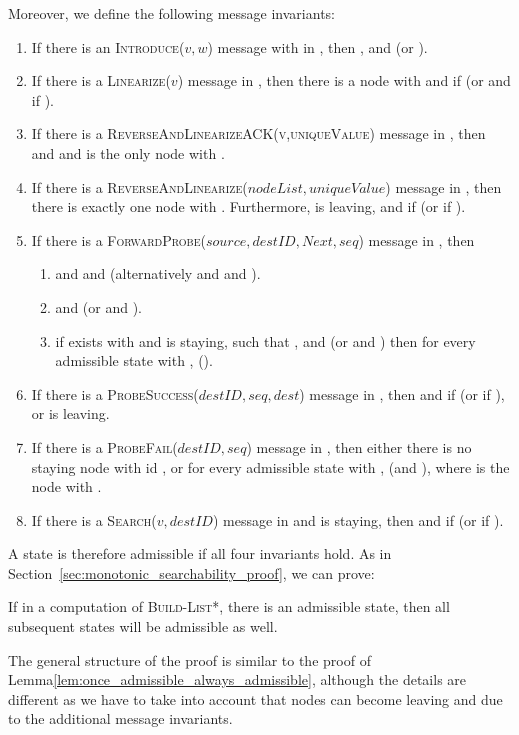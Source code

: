 \documentclass[a4paper,USenglish]{lipics}
\newcommand{\blpp}{\textsc{Build-List*}\xspace}
\newcommand{\linearize}[1]{\textsc{Linearize(\ensuremath{#1})}\xspace}
\newcommand{\introduce}[1]{\textsc{Introduce(\ensuremath{#1})}\xspace}
\newcommand{\search}[1]{\textsc{Search(\ensuremath{#1})}\xspace}
\newcommand{\forwardprobe}[1]{\textsc{ForwardProbe(\ensuremath{#1})}\xspace}
\newcommand{\psuccess}[1]{\textsc{ProbeSuccess(\ensuremath{#1})}\xspace}
\newcommand{\pfail}[1]{\textsc{ProbeFail(\ensuremath{#1})}\xspace}
\newcommand{\revandlin}[1]{\textsc{ReverseAndLinearize(\ensuremath{#1})}\xspace} \newcommand{\revandlinREQ}[1]{\textsc{ReverseAndLinearizeREQ(#1)}\xspace}
\newcommand{\revandlinACK}[1]{\textsc{ReverseAndLinearizeACK(#1)}\xspace}
\begin{document}
Moreover, we define the following message invariants:
\begin{enumerate}
    \item If there is an \introduce{v,w} message with  in , then , and  (or ).
    \item If there is a \linearize{v} message in , then there is a node  with  and  if  (or  and  if ).
    \item If there is a \revandlinACK{v,uniqueValue} message in , then  and  and  is the only node with .
    \item If there is a \revandlin{nodeList,uniqueValue} message in , then there is exactly one node  with .
    Furthermore,  is leaving, and  if  (or  if ).
    \item If there is a \forwardprobe{source,destID,Next,seq} message in , then
    \begin{enumerate}
	\item  and  and  
	(alternatively  and  and ).
	\item  and  (or  and ).
	\item if  exists with  and  is staying, such that , and  (or  and ) then for every admissible state with ,  ().
    \end{enumerate}
    \item If there is a \psuccess{destID, seq, dest} message in , then  and  if  (or  if ), or  is leaving.
    \item If there is a \pfail{destID, seq} message in , then either there is no staying node with id , or for every admissible state with ,  (and ), where  is the node with .
    \item If there is a \search{v, destID} message in  and  is staying, then  and  if  (or  if ).
\end{enumerate}
A state is therefore admissible if all four invariants hold.
As in Section~\ref{sec:monotonic_searchability_proof}, we can prove:
\begin{lemma}\label{lem:blpp_once_admissible_always_admissible}
 If in a computation of \blpp, there is an admissible state, then all subsequent states will be admissible as well.
\end{lemma}
The general structure of the proof is similar to the proof of Lemma\ref{lem:once_admissible_always_admissible}, although the details are different as we have to take into account that nodes can become leaving and due to the additional message invariants.
\end{document}
